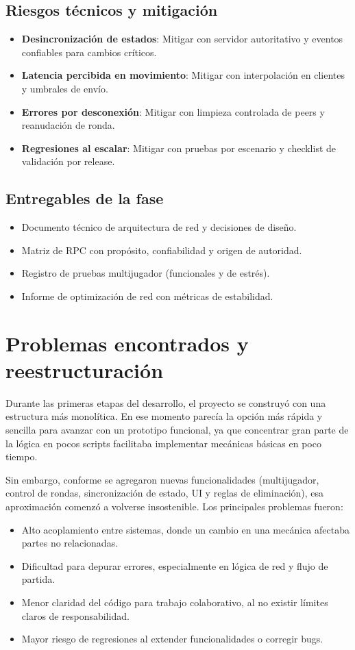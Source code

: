 \documentclass[11pt,a4paper]{article}
\begin{document}
\subsection{Riesgos técnicos y mitigación}
\begin{itemize}[nosep]
    \item \textbf{Desincronización de estados}: Mitigar con servidor autoritativo y eventos confiables para cambios críticos.
    \item \textbf{Latencia percibida en movimiento}: Mitigar con interpolación en clientes y umbrales de envío.
    \item \textbf{Errores por desconexión}: Mitigar con limpieza controlada de peers y reanudación de ronda.
    \item \textbf{Regresiones al escalar}: Mitigar con pruebas por escenario y checklist de validación por release.
\end{itemize}

\subsection{Entregables de la fase}
\begin{itemize}[nosep]
    \item Documento técnico de arquitectura de red y decisiones de diseño.
    \item Matriz de RPC con propósito, confiabilidad y origen de autoridad.
    \item Registro de pruebas multijugador (funcionales y de estrés).
    \item Informe de optimización de red con métricas de estabilidad.
\end{itemize}

\section{Problemas encontrados y reestructuración}
Durante las primeras etapas del desarrollo, el proyecto se construyó con una estructura más monolítica. En ese momento parecía la opción más rápida y sencilla para avanzar con un prototipo funcional, ya que concentrar gran parte de la lógica en pocos scripts facilitaba implementar mecánicas básicas en poco tiempo.

Sin embargo, conforme se agregaron nuevas funcionalidades (multijugador, control de rondas, sincronización de estado, UI y reglas de eliminación), esa aproximación comenzó a volverse insostenible. Los principales problemas fueron:
\begin{itemize}[nosep]
    \item Alto acoplamiento entre sistemas, donde un cambio en una mecánica afectaba partes no relacionadas.
    \item Dificultad para depurar errores, especialmente en lógica de red y flujo de partida.
    \item Menor claridad del código para trabajo colaborativo, al no existir límites claros de responsabilidad.
    \item Mayor riesgo de regresiones al extender funcionalidades o corregir bugs.
\end{itemize}
\end{document}
